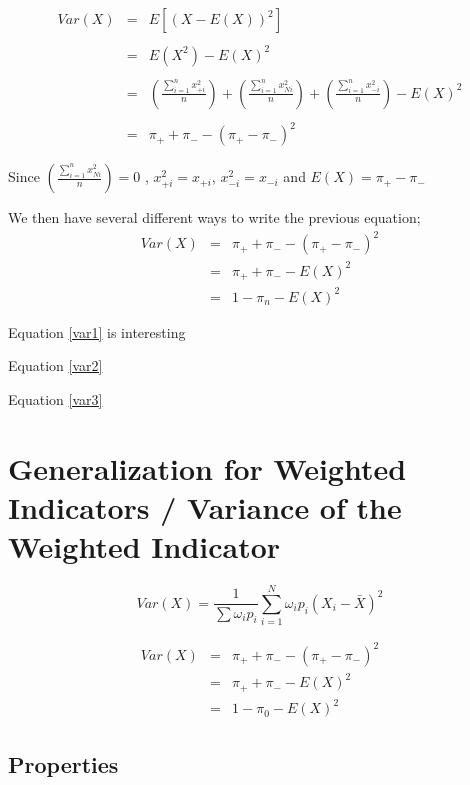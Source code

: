 \documentclass[12pt,a4paper,oneside]{book}
\begin{document}
\begin{eqnarray}
     Var(X) &=& E \left[ \left(X-E(X) \right)^2 \right] \nonumber \\ \nonumber \\
     &=& E\left( X^2\right) - E\left( X\right)^2 \nonumber \\ \nonumber \\
     &=& \left( \frac{\sum_{i=1}^n x_{+i}^2}{n} \right) + \left( \frac{\sum_{i=1}^n x_{Ni}^2}{n} \right) + \left( \frac{\sum_{i=1}^n x_{-i}^2}{n} \right) - E(X)^2  \nonumber \\ \nonumber \\
     &=& \pi_+ + \pi_- - ( \pi_+ - \pi_- )^2 \label{var1}
\end{eqnarray}

Since $\left( \frac{\sum_{i=1}^n x_{Ni}^2}{n} \right) = 0$ ,
$x_{+i}^2 = x_{+i}$, $x_{-i}^2 = x_{-i}$
and $E(X) = \pi_+ - \pi_-$


We then have several different ways to write the previous equation;
\begin{eqnarray}
Var(X) &=& \pi_+ + \pi_- - ( \pi_+ - \pi_- )^2 \nonumber \\
	&=& \pi_+ + \pi_- - E ( X )^2 \label{var2} \\
	&=& 1 - \pi_n - E(X)^2 \label{var3}
\end{eqnarray}

Equation \ref{var1} is interesting 

Equation \ref{var2}

Equation \ref{var3}




\section{Generalization for Weighted Indicators / Variance of the Weighted Indicator}

\begin{equation}
Var(X) = \frac{1}{\sum \omega_i p_i } \sum^N _{i=1} \omega_i p_i (X_i - \bar{X})^2
\end{equation}


\begin{eqnarray}
Var(X) &=& \pi_+ + \pi_- - ( \pi_+ - \pi_- )^2 \\
	&=& \pi_+ + \pi_- - E ( X )^2 \\
	&=& 1 - \pi_0 - E(X)^2
\end{eqnarray}


\subsection{Properties}
\end{document}
